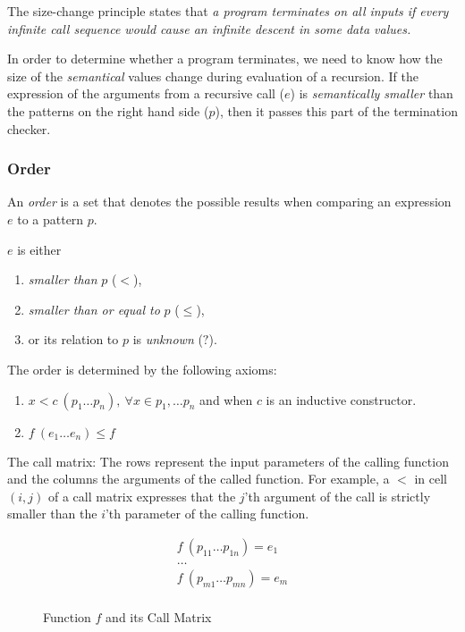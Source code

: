 The size-change principle states that \emph{a program terminates on all inputs if every infinite call sequence would cause an infinite descent in some data values.}

In order to determine whether a program terminates, we need to know how the size of the \emph{semantical} values change during evaluation of a recursion. If the expression of the arguments from a recursive call ($e$) is \emph{semantically smaller} than the patterns on the right hand side ($p$), then it passes this part of the termination checker.

\subsubsection{Order}

An \emph{order} is a set that denotes the possible results when comparing an expression $e$ to a pattern $p$.

$e$ is either

\begin{enumerate}
  \item \emph{smaller than} $p$ ($\boldsymbol{<}$),
  \item \emph{smaller than or equal to} $p$ ($\boldsymbol{\leq}$),
  \item or its relation to $p$ is \emph{unknown} ($\boldsymbol{?}$).
\end{enumerate}

The order is determined by the following axioms:

\begin{enumerate}
  \item $x < c \: (p_1 \dots p_n), \: \forall x \in {p_1, \dots p_n}$ and when $c$ is an inductive constructor.
  \item $f \: (e_1 \dots e_n) \leq f$
\end{enumerate}

The call matrix:
The rows represent the input parameters of the calling function and the columns the arguments of the called function.
For example, a $\boldsymbol{<}$ in cell $(i, j)$ of a call matrix expresses that the $j$'th argument of the call is strictly smaller than the $i$'th parameter of the calling function.
\begin{figure}[H]
  \begin{equation*}
    \begin{aligned}
      f \: (p_{11} \dots p_{1n}) = e_1 \\
      \dots                            \\
      f \: (p_{m1} \dots p_{mn}) = e_m \\
    \end{aligned}
  \end{equation*}
  \caption{Function $f$ and its Call Matrix}
\end{figure}
